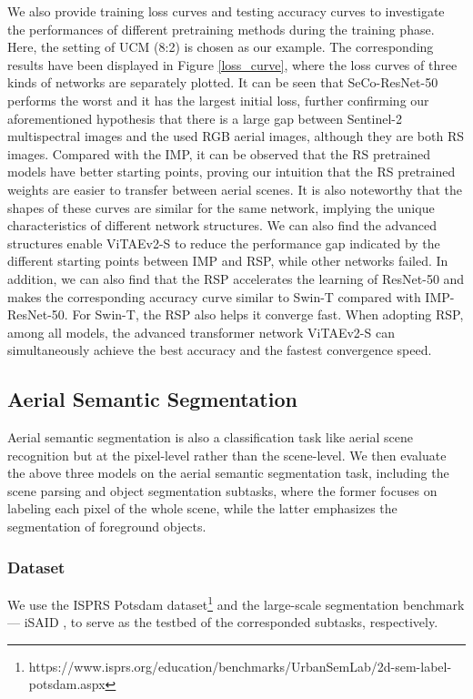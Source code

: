 \documentclass[10pt, journal,twoside]{IEEEtran}
\begin{document}
We also provide training loss curves and testing accuracy curves to investigate the performances of different pretraining methods during the training phase. Here, the setting of UCM (8:2) is chosen as our example. The corresponding results have been displayed in Figure \ref{loss_curve}, where the loss curves of three kinds of networks are separately plotted. It can be seen that SeCo-ResNet-50 performs the worst and it has the largest initial loss, further confirming our aforementioned hypothesis that there is a large gap between Sentinel-2 multispectral images and the used RGB aerial images, although they are both RS images. Compared with the IMP, it can be observed that the RS pretrained models have better starting points, proving our intuition that the RS pretrained weights are easier to transfer between aerial scenes. It is also noteworthy that the shapes of these curves are similar for the same network, implying the unique characteristics of different network structures. We can also find the advanced structures enable ViTAEv2-S to reduce the performance gap indicated by the different starting points between IMP and RSP, while other networks failed. In addition, we can also find that the RSP accelerates the learning of ResNet-50 and makes the corresponding accuracy curve similar to Swin-T compared with IMP-ResNet-50. For Swin-T, the RSP also helps it converge fast. When adopting RSP, among all models, the advanced transformer network ViTAEv2-S can simultaneously achieve the best accuracy and the fastest convergence speed.

\subsection{Aerial Semantic Segmentation}

Aerial semantic segmentation is also a classification task like aerial scene recognition but at the pixel-level rather than the scene-level. We then evaluate the above three models on the aerial semantic segmentation task, including the scene parsing and object segmentation subtasks, where the former focuses on labeling each pixel of the whole scene, while the latter emphasizes the segmentation of foreground objects.

\subsubsection{Dataset} 
We use the ISPRS Potsdam dataset\footnote{https://www.isprs.org/education/benchmarks/UrbanSemLab/2d-sem-label-potsdam.aspx} and the large-scale segmentation benchmark --- iSAID \cite{isaid}, to serve as the testbed of the corresponded subtasks, respectively.
\end{document}
